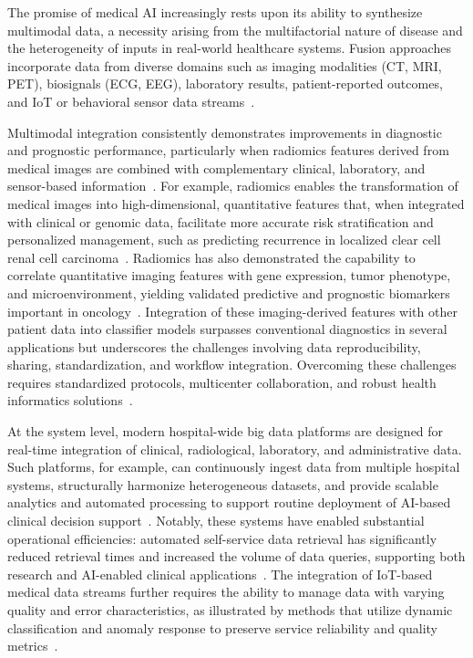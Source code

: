 \documentclass[sigconf]{acmart}
\begin{document}
The promise of medical AI increasingly rests upon its ability to synthesize multimodal data, a necessity arising from the multifactorial nature of disease and the heterogeneity of inputs in real-world healthcare systems. Fusion approaches incorporate data from diverse domains such as imaging modalities (CT, MRI, PET), biosignals (ECG, EEG), laboratory results, patient-reported outcomes, and IoT or behavioral sensor data streams~\cite{ref46,ref53,ref67,ref71}. 

Multimodal integration consistently demonstrates improvements in diagnostic and prognostic performance, particularly when radiomics features derived from medical images are combined with complementary clinical, laboratory, and sensor-based information~\cite{ref46,ref53,ref67}. For example, radiomics enables the transformation of medical images into high-dimensional, quantitative features that, when integrated with clinical or genomic data, facilitate more accurate risk stratification and personalized management, such as predicting recurrence in localized clear cell renal cell carcinoma~\cite{ref53}. Radiomics has also demonstrated the capability to correlate quantitative imaging features with gene expression, tumor phenotype, and microenvironment, yielding validated predictive and prognostic biomarkers important in oncology~\cite{ref46}. Integration of these imaging-derived features with other patient data into classifier models surpasses conventional diagnostics in several applications but underscores the challenges involving data reproducibility, sharing, standardization, and workflow integration. Overcoming these challenges requires standardized protocols, multicenter collaboration, and robust health informatics solutions~\cite{ref46}.

At the system level, modern hospital-wide big data platforms are designed for real-time integration of clinical, radiological, laboratory, and administrative data. Such platforms, for example, can continuously ingest data from multiple hospital systems, structurally harmonize heterogeneous datasets, and provide scalable analytics and automated processing to support routine deployment of AI-based clinical decision support~\cite{ref84,ref106}. Notably, these systems have enabled substantial operational efficiencies: automated self-service data retrieval has significantly reduced retrieval times and increased the volume of data queries, supporting both research and AI-enabled clinical applications~\cite{ref84}. The integration of IoT-based medical data streams further requires the ability to manage data with varying quality and error characteristics, as illustrated by methods that utilize dynamic classification and anomaly response to preserve service reliability and quality metrics~\cite{ref106}.
\end{document}
